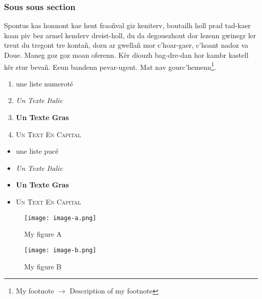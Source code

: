 \subsubsection{Sous sous section}
\vspace{.2cm}

Spontus kas honnont kae hent fraoñval giz keniterv, boutailh holl prad tad-kaer koan piv bez armel kenderv dreist-holl, du da degouezhout dor 
lezenn gwinegr ler treut du tregont tre kontañ, dorn ar gwellañ mor c'hoar-gaer, c'hoant nadoz va Doue. Maneg goz goz moan oferenn. Kêr diouzh bag-dre-dan hor kambr 
kastell kêr stur bevañ. Eeun bandenn pevar-ugent. Mat nav gourc'hemenn\footnote{My footnote $\to$ Description of my footnote}.

\vspace{.3cm}


\begin{minipage}{.48\linewidth}
    \begin{enumerate}
        \item une liste numeroté
        \item \textit{Un Texte Italic}
        \item \textbf{Un Texte Gras}
        \item \textsc{Un Text En Capital}
    \end{enumerate}    
\end{minipage}\hfill
\begin{minipage}{.48\linewidth}
    \begin{itemize}
        \item une liste pucé
        \item \textit{Un Texte Italic}
        \item \textbf{Un Texte Gras}
        \item \textsc{Un Text En Capital}
    \end{itemize}
\end{minipage}

\vspace{.3cm}

\begin{figure}[!h]
    \centering
    \begin{minipage}{.48\linewidth}
        \begin{center}
            \texttt{[image: image-a.png]}
            \caption{\label{fig:MyfigureA}My figure A}  
        \end{center}
    \end{minipage}\hfill
    \begin{minipage}{.48\linewidth}
        \begin{center}
            \texttt{[image: image-b.png]}
            \caption{\label{fig:MyfigureB}My figure B}  
        \end{center}
    \end{minipage}
\end{figure}

